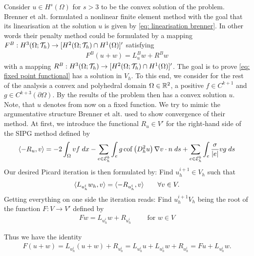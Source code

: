 Consider $u\in H^s(\Omega)$ for $s>3$ to be the convex solution of the \MA problem. Brenner et alt. formulated a nonlinear finite element method with the goal that its linearisation at the solution $u$ is given by \eqref{eq: linearisation brenner}. In other words their penalty method could be formulated by a mapping $F^B:H^3(\Omega; \mathcal{T}_h) \rightarrow [H^2(\Omega; \mathcal{T}_h) \cap H^1(\Omega)]'$ satisfying
 \begin{align}
 	F^B(u +w ) = L^B_u w + R^Bw \label{eq: add brenner method}
 \end{align}
 with a mapping $R^B:H^3(\Omega; \mathcal{T}_h) \rightarrow [H^2(\Omega; \mathcal{T}_h) \cap H^1(\Omega)]'$. 
% 
The goal is to prove \eqref{eq: fixed point functional} has a solution in $V_h$. To this end, we consider for the rest of the analysis a convex and polyhedral domain $\Omega\in \mathbb{R}^2$, a positive $f \in C^{k+1}$ and $g\in C^{k+3}(\partial \Omega)$. By the results of \cite{CNS1984} the \MA problem then has a convex solution $u$. Note, that $u$ denotes from now on a fixed function.
We try to mimic the argumentative structure Brenner et alt. used to show convergence of their method. At first, we introduce the functional $R_u \in V'$ for the right-hand side of the SIPG method defined by
\[
 \langle -R_u, v \rangle = - 2 \int_{\Omega} {{v f}\;dx}
-\sum\limits_{e \in \mathcal{E}_h^b}\int_{e} {{ g \operatorname{cof} \left( D_h^2 u \right) \nabla v \cdot n }\;ds}
+\sum\limits_{e \in \mathcal{E}_h^b} \int_{e} {{ \frac \sigma {|e|} v g}\;ds} \label{eq: definition R}
\]
Our desired Picard iteration is then formulated by: Find $u^{i+1}_h \in V_h$ such that
\begin{align}
 \langle L_{u^i_h} w_h, v \rangle =   \langle -R_{u^i_h}, v \rangle   \qquad \forall v \in V. \label{eq: fixed point functional}
\end{align}
Getting everything on one side the iteration reads: Find $u_h^{i+1}V_h$ being the root of the function $F:V \rightarrow V'$ defined by
\begin{align*}
 {Fw} =  L_{u^i_h} w + R_{u^i_h}  \qquad \text{ for } w \in V
\end{align*}

Thus we have the identity 
\begin{align}
	F(u+w) = L_{u^i_h} (u+w) + R_{u^i_h} = L_{u^i_h} u +L_{u^i_h}w + R_{u^i_h} = Fu + L_{u^i_h}w. \label{eq: add our method}
\end{align}

